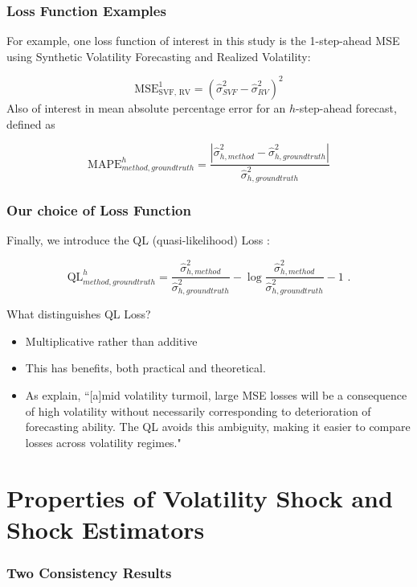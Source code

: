 \documentclass[9pt]{beamer}
\theoremstyle{definition}
\begin{document}
\begin{frame}
    \frametitle{Loss Function Examples}
For example, one loss function of interest in this study is the 1-step-ahead MSE using Synthetic Volatility Forecasting and Realized Volatility:

$$\text{MSE}^{1}_{\text{SVF, RV}} = (\hat\sigma^{2}_{SVF} - \hat\sigma^{2}_{RV})^{2}$$
Also of interest in mean absolute percentage error for an $h$-step-ahead forecast, defined as

$$\text{MAPE}^{h}_{method, ground truth} = \frac{|\hat\sigma^{2}_{h, method} - \hat\sigma^{2}_{h, ground truth}|}{\hat\sigma^{2}_{h, ground truth}}$$

\end{frame}

\begin{frame}\frametitle{Our choice of Loss Function}

    Finally, we introduce the QL (quasi-likelihood) Loss \parencite[][]{brownlees2011practical}:

    $$\text{QL}^{h}_{method, ground truth} = \frac{ \hat\sigma^{2}_{h, method} }{\hat\sigma^{2}_{h, ground truth}} - \log{\frac{ \hat\sigma^{2}_{h, method} }{\hat\sigma^{2}_{h, ground truth}}} -1 \text{ .}$$
    
What distinguishes QL Loss? \\

\begin{itemize}

\item Multiplicative rather than additive

\item This has benefits, both practical and theoretical.  

\item As \cite[][]{brownlees2011practical} explain, ``[a]mid volatility turmoil, large MSE
losses will be a consequence of high volatility without necessarily corresponding to deterioration of forecasting ability. The QL avoids this ambiguity, making it easier to compare losses across volatility regimes."

\end{itemize}

\end{frame}

\section{Properties of Volatility Shock and Shock Estimators}\label{SVF_properties}
\frametitle{Two Consistency Results}
\end{document}
